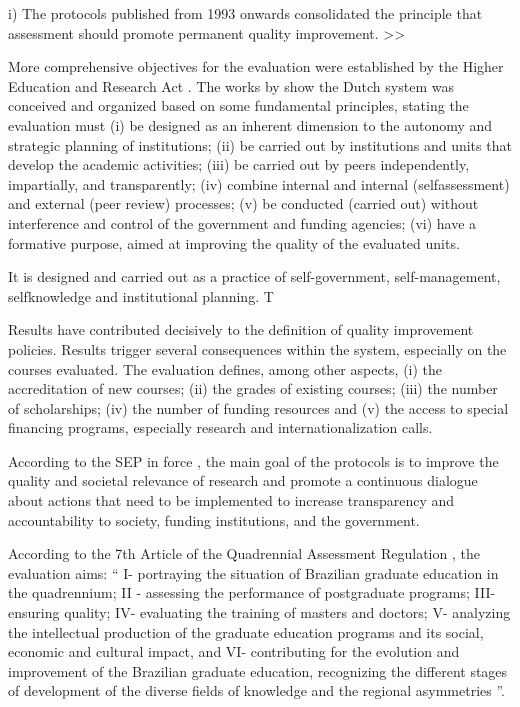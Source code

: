 

i)	The protocols published from 1993 onwards consolidated the principle that assessment should promote permanent quality improvement. >>

More comprehensive objectives for the evaluation were established by the Higher Education and Research Act \autocite{OCW.1992}. The works by \textcite{Goedegebuure.1991, Drooge.2013, Weert.2007} show the Dutch system was conceived and organized based on some fundamental principles, stating the evaluation must (i) be designed as an inherent dimension to the autonomy and strategic planning of institutions; (ii) be carried out by institutions and units that develop the academic activities; (iii) be carried out by peers independently, impartially, and transparently; (iv) combine internal and internal (selfassessment) and external (peer review) processes; (v) be conducted (carried out) without interference and control of the government and funding agencies; (vi) have a formative purpose, aimed at improving the quality of the evaluated units.


It is designed and carried out as a practice of self-government, self-management, selfknowledge and institutional planning. T

Results have contributed decisively to the definition of quality improvement policies. Results trigger several consequences within the system, especially on the courses evaluated. The evaluation defines, among other aspects, (i) the accreditation of new courses; (ii) the grades of existing courses; (iii) the number of scholarships; (iv) the number of funding resources and (v) the access to special financing programs, especially research and internationalization calls.

According to the SEP in force \autocite[6]{VSNU.2020}, the main goal of the protocols is to improve the quality and societal relevance of research and promote a continuous dialogue about actions that need to be implemented to increase transparency and accountability to society, funding institutions, and the government.

	According to the 7th Article of the Quadrennial Assessment Regulation \autocite{122/2021}, the evaluation aims: “\textelp{} I- portraying the situation of Brazilian graduate education in the quadrennium; II - assessing the performance of postgraduate programs; III- ensuring quality; IV- evaluating the training of masters and doctors; V- analyzing the intellectual production of the graduate education programs and its social, economic and cultural impact, and VI- contributing for the evolution and improvement of the Brazilian graduate
education, recognizing the different stages of development of the diverse fields of knowledge and the regional asymmetries \textelp{}”.

